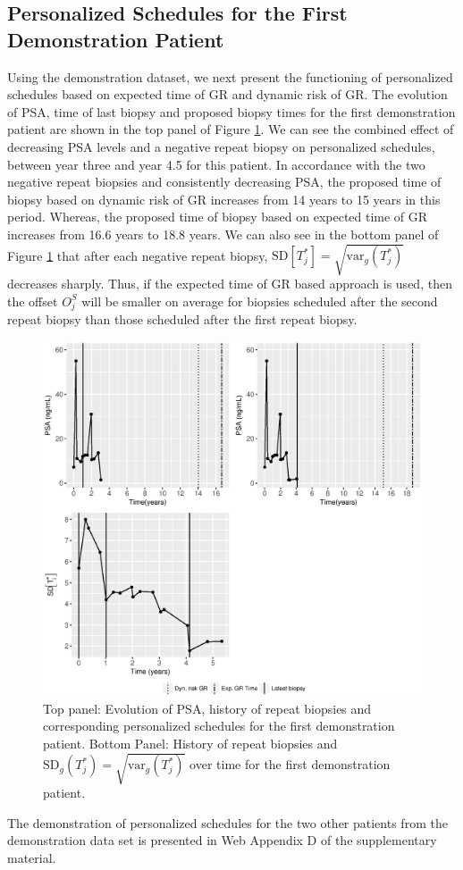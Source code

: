 \subsection{Personalized Schedules for the First Demonstration Patient}
\label{subsec : demo_prias_pers_schedule}
Using the demonstration dataset, we next present the functioning of personalized schedules based on expected time of GR and dynamic risk of GR. The evolution of PSA, time of last biopsy and proposed biopsy times for the first demonstration patient are shown in the top panel of Figure \ref{web_fig : prias_demo_pid_911}. We can see the combined effect of decreasing PSA levels and a negative repeat biopsy on personalized schedules, between year three and year 4.5 for this patient. In accordance with the two negative repeat biopsies and consistently decreasing PSA, the proposed time of biopsy based on dynamic risk of GR increases from 14 years to 15 years in this period. Whereas, the proposed time of biopsy based on expected time of GR increases from 16.6 years to 18.8 years. We can also see in the bottom panel of Figure \ref{web_fig : prias_demo_pid_911} that after each negative repeat biopsy, $\mbox{SD}[T^*_j] = \sqrt{\mbox{var}_g(T^*_j)}$ decreases sharply. Thus, if the expected time of GR based approach is used, then the offset $O^S_j$ will be smaller on average for biopsies scheduled after the second repeat biopsy than those scheduled after the first repeat biopsy.

\begin{figure}
\centerline{
\includegraphics[width=\columnwidth]{images/prias_demo/case_911.eps}
}
\caption{Top panel: Evolution of PSA, history of repeat biopsies and corresponding personalized schedules for the first demonstration patient. Bottom Panel: History of repeat biopsies and $\mbox{SD}_g(T^*_j) = \sqrt{\mbox{var}_g(T^*_j)}$ over time for the first demonstration patient.}
\label{web_fig : prias_demo_pid_911}
\end{figure}

The demonstration of personalized schedules for the two other patients from the demonstration data set is presented in Web Appendix D of the supplementary material.